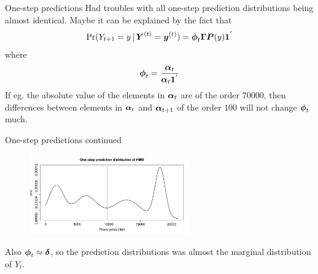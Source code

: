 \begin{frame}{One-step predictions}
    Had troubles with all one-step prediction distributions being almost identical. Maybe it can be explained by the fact that
    \begin{equation*}
        \textrm{Pr}(Y_{t+1}=y\,|\,\boldsymbol{Y}^{(t)} = \boldsymbol{y}^{(t)}) = \boldsymbol{\phi}_t\boldsymbol{\Gamma}\boldsymbol{P}(y)\boldsymbol{1}^{'}
    \end{equation*}
    where
    \begin{equation*}
        \boldsymbol{\phi}_t = \frac{\boldsymbol{\alpha}_t}{\boldsymbol{\alpha}_t\boldsymbol{1}^{'}}
    \end{equation*}
    If eg. the absolute value of the elements in $\boldsymbol{\alpha}_t$ are of the order $70000$, then differences between elements in $\boldsymbol{\alpha}_t$ and $\boldsymbol{\alpha}_{t+1}$ of the order $100$ will not change $\boldsymbol{\phi}_t$ much.
\end{frame}

\begin{frame}{One-step predictions continued}
    \begin{figure}
    \includegraphics[width=260px]{../plots/one-step-dist.pdf}
    \end{figure}
    Also $\boldsymbol{\phi}_t\approx\boldsymbol{\delta}$, so the prediction distributions was almost the marginal distribution of $Y_t$.
\end{frame}




